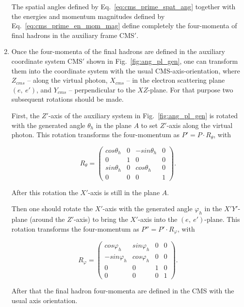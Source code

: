 \begin{enumerate}
The spatial angles defined by Eq.~\eqref{eq:cms_prime_spat_ang} together with the energies and momentum magnitudes defined by Eq.~\eqref{eq:cms_prime_en_mom_mag} define completely the four-momenta of final hadrons in the auxiliary frame CMS$'$.

\item Once the four-momenta of the final hadrons are defined in the auxiliary coordinate system CMS$'$ shown in Fig.~\ref{fig:ang_pl_gen}, one can transform them into the coordinate system with the usual CMS-axis-orientation, where $Z_{cms}$ -- along the virtual photon, $X_{cms}$ -- in the electron scattering plane $(e,~e')$, and $Y_{cms}$ -- perpendicular to the $XZ$-plane. For that purpose two subsequent rotations should be made.

First, the $Z'$-axis of the auxiliary system in Fig.~\ref{fig:ang_pl_gen} is rotated with the generated angle $\theta_{h}$ in the plane $A$ to set  $Z'$-axis along the virtual photon. This rotation transforms the four-momentum as $P' = P\cdot R_{\theta}$, with 

\begin{equation}
R_{\theta}=\begin{pmatrix}
cos\theta_{h} &0  &-sin\theta_{h}  &0 \\ 
 0& 1 & 0 &0 \\ 
 sin\theta_{h} &0  &cos\theta_{h}  & 0\\ 
0 &0  & 0 &1 
\end{pmatrix}.
\end{equation}

After this rotation the $X'$-axis is still in the plane $A$.

Then one should rotate the $X'$-axis with the generated angle $\varphi_{h}$ in the $X'Y'$-plane (around the $Z'$-axis) to bring the $X'$-axis into the $(e,~e')$-plane. This rotation transforms the four-momentum as $P'' = P'\cdot R_{\varphi}$, with 

\begin{equation}
R_{\varphi} = \begin{pmatrix}
 cos\varphi_{h}& sin\varphi_{h} & 0 &0 \\ 
 -sin\varphi_{h}& cos\varphi_{h} &  0& 0\\ 
0 & 0 & 1 &0 \\ 
 0&  0&  0&1 
\end{pmatrix}.
\end{equation}


After that the final hadron four-momenta are defined in the CMS with the usual axis orientation. 



\end{enumerate}
